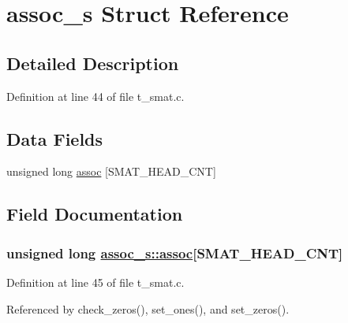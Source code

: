 \hypertarget{structassoc__s}{
\section{assoc\_\-s Struct Reference}
\label{structassoc__s}
}


\subsection{Detailed Description}




Definition at line 44 of file t\_\-smat.c.\subsection*{Data Fields}
\begin{CompactItemize}
\item 
unsigned long \hyperlink{structassoc__s_o0}{assoc} \mbox{[}SMAT\_\-HEAD\_\-CNT\mbox{]}
\end{CompactItemize}


\subsection{Field Documentation}
\hypertarget{structassoc__s_o0}{
\subsubsection[assoc]{\setlength{\rightskip}{0pt plus 5cm}unsigned long \hyperlink{structassoc__s_o0}{assoc\_\-s::assoc}\mbox{[}SMAT\_\-HEAD\_\-CNT\mbox{]}}}
\label{structassoc__s_o0}




Definition at line 45 of file t\_\-smat.c.

Referenced by check\_\-zeros(), set\_\-ones(), and set\_\-zeros().